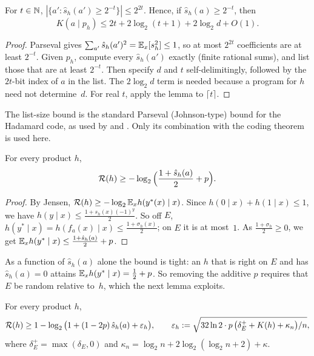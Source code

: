 \begin{lemma}\label{lem:simplicity:listdecode}
For $t\in\mathbb{N}$, $|\{a':\hat s_h(a')\ge2^{-t}\}|\le2^{2t}$. Hence, if $\hat s_h(a)\ge2^{-t}$, then
\[
K(a\mid p_h)\le2t+2\log_2(t+1)+2\log_2d+O(1).
\]
\end{lemma}

\begin{proof}
Parseval gives $\sum_{a'}\hat s_h(a')^2=\mathbb{E}_x[s_h^2]\le1$, so at most $2^{2t}$ coefficients are at least $2^{-t}$. Given $p_h$, compute every $\hat s_h(a')$ exactly (finite rational sums), and list those that are at least $2^{-t}$. Then specify $d$ and $t$ self-delimitingly, followed by the $2t$-bit index of $a$ in the list. The $2\log_2d$ term is needed because a program for $h$ need not determine~$d$. For real $t$, apply the lemma to $\lceil t\rceil$.
\end{proof}

The list-size bound is the standard Parseval (Johnson-type) bound for the Hadamard code, as used by \citet{goldreich1989hard} and \citet{kushilevitz1993learning}. Only its combination with the coding theorem is used here.

\begin{lemma}\label{lem:simplicity:corr}
For every product $h$,
\[
\mathcal R(h)\ge-\log_2\Big(\frac{1+\hat s_h(a)}2+p\Big).
\]
\end{lemma}

\begin{proof}
By Jensen, $\mathcal R(h)\ge-\log_2\mathbb{E}_xh(y^*(x)\mid x)$. Since $h(0\mid x)+h(1\mid x)\le1$, we have $h(y\mid x)\le\frac{1+s_h(x)(-1)^y}2$. So off $E$, $h(y^*\mid x)=h(f_a(x)\mid x)\le\frac{1+\sigma_h(x)}2$; on $E$ it is at most~$1$. As $\frac{1+\sigma_h}2\ge0$, we get $\mathbb{E}_xh(y^*\mid x)\le\frac{1+\hat s_h(a)}2+p$.
\end{proof}

As a function of $\hat s_h(a)$ alone the bound is tight: an $h$ that is right on $E$ and has $\hat s_h(a)=0$ attains $\mathbb{E}_xh(y^*\mid x)=\frac12+p$. So removing the additive $p$ requires that $E$ be random relative to~$h$, which the next lemma exploits.

\begin{lemma}\label{lem:simplicity:random}
For every product $h$,
\[
\mathcal R(h)\ge1-\log_2\big(1+(1-2p)\,\hat s_h(a)+\varepsilon_h\big),\qquad\varepsilon_h:=\sqrt{32\ln2\cdot p\,\big(\delta_E^++K(h)+\kappa_n\big)/n},
\]
where $\delta_E^+=\max(\delta_E,0)$ and $\kappa_n=\log_2n+2\log_2(\log_2n+2)+\kappa$.
\end{lemma}

